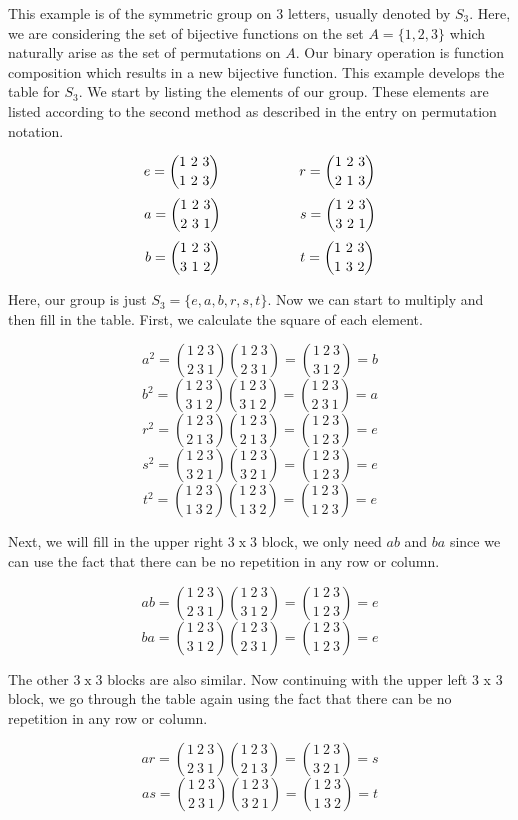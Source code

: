 \documentclass[12pt]{article}
\begin{document}

This example is of the symmetric group on $3$ letters, usually denoted by $S_3$.  Here, we are considering the set of bijective functions on the set $A=\{1,2,3\}$ which naturally arise as the set of permutations on $A$.  Our binary operation is function composition which results in a new bijective function.  This example develops the  table for $S_3$.  We start by listing the elements of our group.  These elements are listed according to the second method as described in the entry on permutation notation.

$$e={ 1\ 2\ 3 \choose 1\ 2\ 3} \hspace{20mm}  r ={ 1\ 2\ 3 \choose 2\ 1\ 3}$$
$$a={ 1\ 2\ 3 \choose 2\ 3\ 1} \hspace{20mm} s ={ 1\ 2\ 3 \choose 3\ 2\ 1}$$
$$b={ 1\ 2\ 3 \choose 3\ 1\ 2} \hspace{20mm} t ={ 1\ 2\ 3 \choose 1\ 3\ 2}$$

Here, our group is just $S_3=\{e,a,b,r,s,t\}$.  Now we can start to multiply and then fill in the table.
First, we calculate the square of each element.

$$a^2={ 1\ 2\ 3 \choose 2\ 3\ 1}{ 1\ 2\ 3 \choose 2\ 3\ 1}={ 1\ 2\ 3 \choose 3\ 1\ 2}= b$$
$$b^2={ 1\ 2\ 3 \choose 3\ 1\ 2}{ 1\ 2\ 3 \choose 3\ 1\ 2}={ 1\ 2\ 3 \choose 2\ 3\ 1}= a$$
$$r^2={ 1\ 2\ 3 \choose 2\ 1\ 3}{ 1\ 2\ 3 \choose 2\ 1\ 3}={ 1\ 2\ 3 \choose 1\ 2\ 3}=e$$
$$s^2={ 1\ 2\ 3 \choose 3\ 2\ 1}{ 1\ 2\ 3 \choose 3\ 2\ 1}={ 1\ 2\ 3 \choose 1\ 2\ 3}=e$$
$$t^2={ 1\ 2\ 3 \choose 1\ 3\ 2}{ 1\ 2\ 3 \choose 1\ 3\ 2}={ 1\ 2\ 3 \choose 1\ 2\ 3}=e$$

Next, we will fill in the upper right $3\operatorname{x}3$ block, we only need $ab$ and $ba$ since we can use the fact that there can be no repetition in any row or column.

$$ ab ={ 1\ 2\ 3 \choose 2\ 3\ 1}{ 1\ 2\ 3 \choose 3\ 1\ 2}={ 1\ 2\ 3 \choose 1\ 2\ 3}=e$$
$$ ba ={ 1\ 2\ 3 \choose 3\ 1\ 2}{ 1\ 2\ 3 \choose 2\ 3\ 1}={ 1\ 2\ 3 \choose 1\ 2\ 3}= e$$

The other $3\operatorname{x}3$ blocks are also similar.  Now continuing with the upper left 3 x 3 block, we go through the table again using the fact that there can be no repetition in any row or column.

$$ ar ={ 1\ 2\ 3 \choose 2\ 3\ 1}{ 1\ 2\ 3 \choose 2\ 1\ 3}={ 1\ 2\ 3 \choose 3\ 2\ 1}= s$$
$$ as ={ 1\ 2\ 3 \choose 2\ 3\ 1}{ 1\ 2\ 3 \choose 3\ 2\ 1}={ 1\ 2\ 3 \choose 1\ 3\ 2}= t$$
\end{document}
